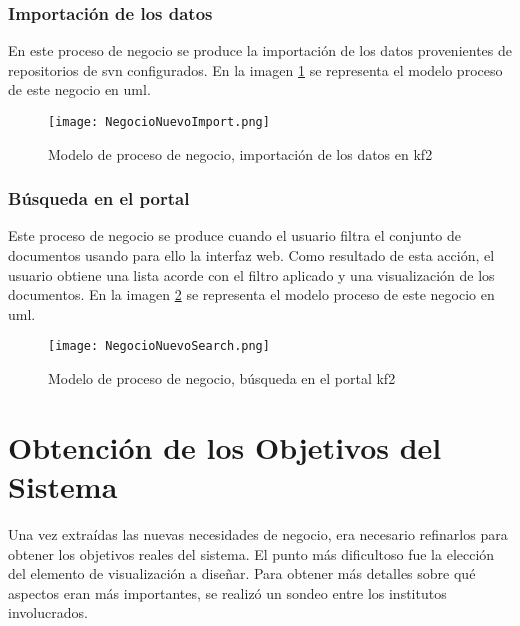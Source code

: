 \subsubsection{Importación de los datos}
En este proceso de negocio se produce la importación de los datos provenientes de repositorios de \gls{svn} configurados. En la imagen \ref{image:negimport2} se representa el modelo proceso de este negocio en \gls{uml}.

\begin{figure}[H]
  \centering
    \texttt{[image: NegocioNuevoImport.png]} 
  \caption{Modelo de proceso de negocio, importación de los datos en \gls{kf2}}
  \label{image:negimport2}
\end{figure}

\subsubsection{Búsqueda en el portal}
Este proceso de negocio se produce cuando el usuario filtra el conjunto de documentos usando para ello la interfaz web. Como resultado de esta acción, el usuario obtiene una lista acorde con el filtro aplicado y una visualización de los documentos.  En la imagen \ref{image:negsearch2} se representa el modelo proceso de este negocio en \gls{uml}.

\begin{figure}[H]
  \centering
    \texttt{[image: NegocioNuevoSearch.png]} 
  \caption{Modelo de proceso de negocio, búsqueda en el portal \gls{kf2}}
  \label{image:negsearch2}
\end{figure}

\section{Obtención de los Objetivos del Sistema}
Una vez extraídas las nuevas necesidades de negocio, era necesario refinarlos para obtener los objetivos reales del sistema. El punto más dificultoso fue la elección del elemento de visualización a diseñar. Para obtener más detalles sobre qué aspectos eran más importantes, se realizó un sondeo entre los institutos involucrados.\\

